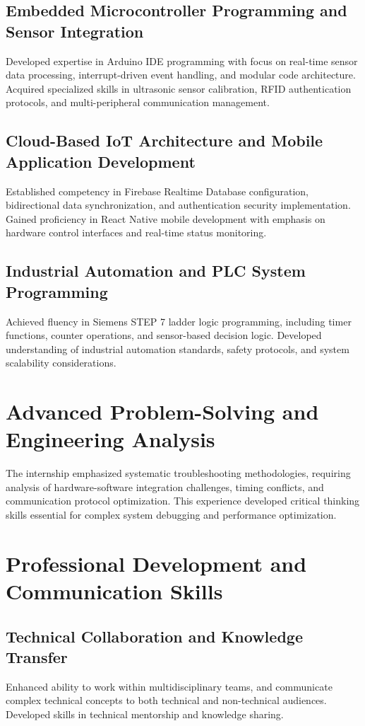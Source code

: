 \documentclass[12pt,a4paper]{report}
\begin{document}
\subsection{Embedded Microcontroller Programming and Sensor Integration}
\noindent Developed expertise in Arduino IDE programming with focus on real-time sensor data processing, interrupt-driven event handling, and modular code architecture. Acquired specialized skills in ultrasonic sensor calibration, RFID authentication protocols, and multi-peripheral communication management.

\subsection{Cloud-Based IoT Architecture and Mobile Application Development}
\noindent Established competency in Firebase Realtime Database configuration, bidirectional data synchronization, and authentication security implementation. Gained proficiency in React Native mobile development with emphasis on hardware control interfaces and real-time status monitoring.

\subsection{Industrial Automation and PLC System Programming}
\noindent Achieved fluency in Siemens STEP 7 ladder logic programming, including timer functions, counter operations, and sensor-based decision logic. Developed understanding of industrial automation standards, safety protocols, and system scalability considerations.

\section{Advanced Problem-Solving and Engineering Analysis}

\noindent The internship emphasized systematic troubleshooting methodologies, requiring analysis of hardware-software integration challenges, timing conflicts, and communication protocol optimization. This experience developed critical thinking skills essential for complex system debugging and performance optimization.

\section{Professional Development and Communication Skills}

\subsection{Technical Collaboration and Knowledge Transfer}
\noindent Enhanced ability to work within multidisciplinary teams, and communicate complex technical concepts to both technical and non-technical audiences. Developed skills in technical mentorship and knowledge sharing.
\end{document}
